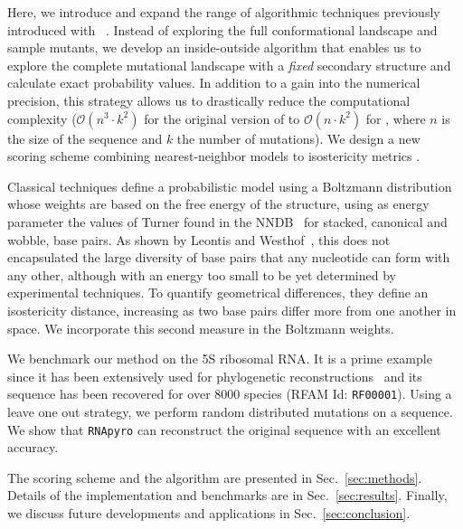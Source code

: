 Here, we introduce \RNApyro and expand the range of algorithmic techniques previously introduced with \RNAmutants~\cite{Waldispuhl2008}.
Instead of exploring the full conformational landscape and sample mutants, we develop an inside-outside algorithm that enables us
to explore the complete mutational landscape with a \emph{fixed} secondary structure and calculate exact probability values. In addition to a gain into the
numerical precision, this strategy allows us to drastically reduce the computational complexity ($\mathcal{O}(n^3 \cdot k^2)$ for the original version of 
\RNAmutants to $\mathcal{O}(n \cdot k^2)$ for \RNApyro, where $n$ is the size of the sequence and $k$ the number of mutations).
We design a new scoring scheme combining nearest-neighbor models \cite{Turner2010} to isostericity metrics \cite{Stombaugh2009}.

Classical techniques define a probabilistic model using a Boltzmann distribution 
whose weights are based on the free energy of the structure, using as energy parameter
the values of Turner found in the NNDB~\cite{Turner2010}  for stacked, 
canonical and wobble, base pairs. As shown by Leontis and Westhof~\cite{Leontis2001},
this  does not encapsulated the large diversity of base pairs that any nucleotide
can form with any other, although with an energy too small to be yet determined
by experimental techniques. To quantify geometrical differences, they
 define an isostericity distance, increasing as two base pairs differ 
 more from one another in space. We incorporate this second measure in the Boltzmann weights.
 
We benchmark our method on the 5S ribosomal RNA. It is a prime example since it has been extensively used for phylogenetic
reconstructions~\cite{Hori1987} and its sequence has been recovered for over 8000 species
 (RFAM Id: \texttt{RF00001}).
 Using a leave one out strategy, we perform random distributed mutations on a sequence. We show that
\texttt{RNApyro} can reconstruct the original sequence with an excellent accuracy.

The scoring scheme and the algorithm are presented in Sec.~\ref{sec:methods}.
Details of the implementation and benchmarks are in Sec.~\ref{sec:results}. 
Finally, we discuss future developments and applications in Sec.~\ref{sec:conclusion}.
